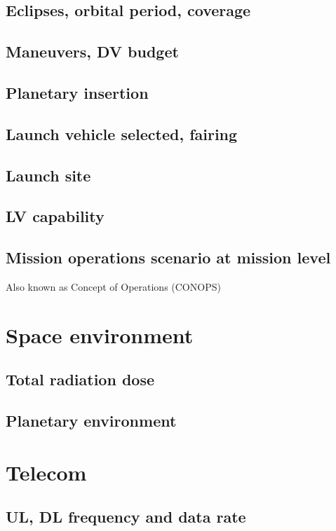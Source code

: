 \subsection{Eclipses, orbital period, coverage}

\subsection{Maneuvers, DV budget}

\subsection{Planetary insertion}

\subsection{Launch vehicle selected, fairing}

\subsection{Launch site}

\subsection{LV capability}

\subsection{Mission operations scenario at mission level}
Also known as Concept of Operations (CONOPS)

\section{Space environment}
\subsection{Total radiation dose}
\subsection{Planetary environment }

\section{Telecom}
\subsection{UL, DL frequency and data rate}
